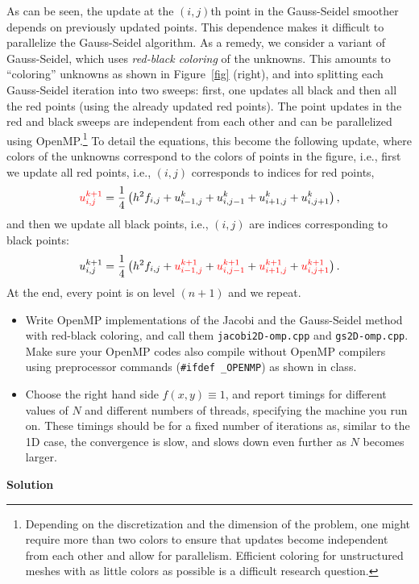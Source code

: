 \documentclass[12pt]{article}
\begin{document}
\begin{enumerate}
  As can be seen, the update at the $(i,j)$th point in the Gauss-Seidel
  smoother depends on previously updated points. This dependence makes
  it difficult to parallelize the Gauss-Seidel algorithm. As a remedy,
  we consider a variant of Gauss-Seidel, which uses \emph{red-black
    coloring} of the unknowns. This amounts to ``coloring'' unknowns as
  shown in Figure~\ref{fig} (right), and into splitting each
  Gauss-Seidel iteration into two sweeps: first, one updates all black
  and then all the red points (using the already updated red
  points). The point updates in the red and black sweeps are
  independent from each other and can be
  parallelized using OpenMP.\footnote{Depending on the discretization and the
    dimension of the problem, one might require more than two colors
    to ensure that updates become independent from each other and
    allow for parallelism. Efficient coloring for unstructured meshes
    with as little colors as possible is a difficult research
    question.}
  To detail the equations, this become the following update, where colors of the
  unknowns correspond to the colors of points in the figure, i.e.,
  first we update all red points, i.e., $(i,j)$ corresponds to indices
  for red points,
  \begin{equation*}
  \textcolor{red}{u_{i,j}^{k+1}} = \frac{1}{4}\left(h^2 f_{i,j} + u^{k}_{i-1,j}+
  u^{k}_{i,j-1}+ u^k_{i+1,j}+ u^k_{i,j+1} \right),
  \end{equation*}
  and then we update all black points, i.e.,  $(i,j)$ are indices
  corresponding to black points:
  \begin{equation*}
    \textcolor{black}{u_{i,j}^{k+1}} = \frac{1}{4}\left(h^2 f_{i,j} + \textcolor{red}{u^{k+1}_{i-1,j}}+
    \textcolor{red}{u^{k+1}_{i,j-1}}+ \textcolor{red}{u^{k+1}_{i+1,j}}+
    \textcolor{red}{u^{k+1}_{i,j+1}} \right).
  \end{equation*}
  At the end, every point is on level $(n+1)$ and we repeat.
    \begin{itemize}
  \item Write OpenMP implementations of the Jacobi and the
    Gauss-Seidel method with red-black coloring, and call them
    \texttt{jacobi2D-omp.cpp} and \texttt{gs2D-omp.cpp}. Make sure your
    OpenMP codes also compile without OpenMP compilers using
    preprocessor commands (\texttt{\#ifdef \_OPENMP}) as shown in
    class.
  \item Choose the right hand side $f(x,y)\equiv 1$, and report
    timings for different values of $N$ and different numbers of
    threads, specifying the machine you run on. These timings should
    be for a fixed number of iterations as, similar to the 1D case,
    the convergence is slow, and slows down even further as $N$
    becomes larger.
  \end{itemize}
  \textbf{Solution}
  \vspace{3em}

\end{enumerate}
\end{document}
